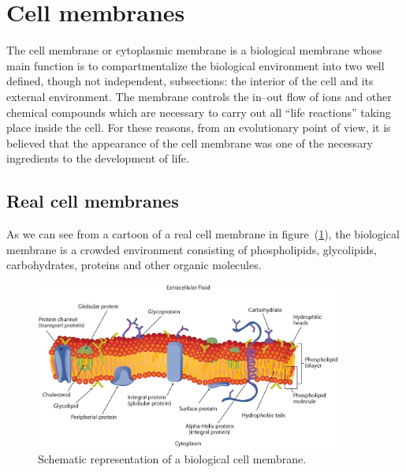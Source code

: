 \section{Cell membranes}
The cell membrane or cytoplasmic membrane is a biological membrane whose main function is to compartmentalize the 
biological environment into two well defined, though not independent, subsections: the interior of the cell and 
its external environment. The membrane controls the in--out flow of ions and other chemical compounds which are 
necessary to carry out all ``life reactions'' taking place inside the cell. For these reasons, from an 
evolutionary point of view, it is believed that the appearance of the cell membrane was one of the necessary 
ingredients to the development of life.

\subsection{Real cell membranes}
As we can see from a cartoon of a real cell membrane in figure~(\ref{fig:cellMembrane}), the biological membrane is a crowded environment consisting of phospholipids, glycolipids, carbohydrates, proteins and other organic molecules.
\begin{figure}[!ht]
	\centering
	\includegraphics[width=0.9\textwidth]{./img/cellMembrane}
	\caption{Schematic representation of a biological cell membrane.}
	\label{fig:cellMembrane}
\end{figure}


